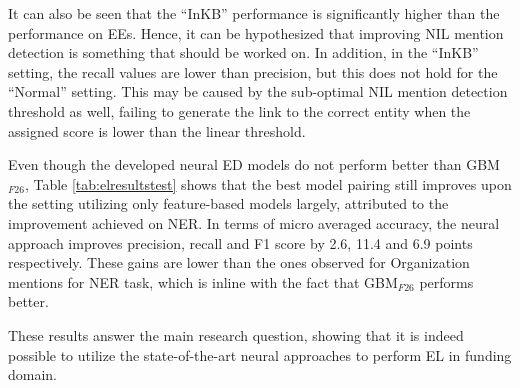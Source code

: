 \documentclass{report}
\theoremstyle{definition}
\theoremstyle{remark}
\begin{document}
It can also be seen that the ``InKB'' performance is significantly higher than the performance on EEs. Hence, it can be hypothesized that improving NIL mention detection is something that should be worked on. In addition, in the ``InKB'' setting, the recall values are lower than precision, but this does not hold for the ``Normal'' setting. This may be caused by the sub-optimal NIL mention detection threshold as well, failing to generate the link to the correct entity when the assigned score is lower than the linear threshold.

Even though the developed neural ED models do not perform better than GBM$_{F26}$, Table \ref{tab:elresultstest} shows that the best model pairing still improves upon the setting utilizing only feature-based models largely, attributed to the improvement achieved on NER. In terms of micro averaged accuracy, the neural approach improves precision, recall and F1 score by 2.6, 11.4 and 6.9 points respectively. These gains are lower than the ones observed for Organization mentions for NER task, which is inline with the fact that GBM$_{F26}$ performs better.

These results answer the main research question, showing that it is indeed possible to utilize the state-of-the-art neural approaches to perform EL in funding domain.
\end{document}
